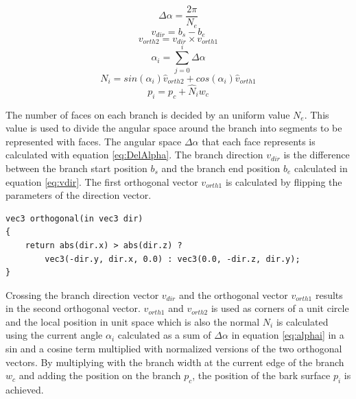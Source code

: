 \documentclass[11pt]{article} %
\begin{document}
\begin{equation}
	\label{eq:DelAlpha}
	\Delta \alpha = \frac{2 \pi}{N_{e}}
\end{equation}
\begin{equation}
	\label{eq:vdir}
	v_{dir} = b_{s} - b_{e} 
\end{equation}
\begin{equation}
	\label{eq:vcross}
	v_{orth2} = v_{dir}\times v_{orth1}
\end{equation}
\begin{equation}
	\label{eq:alphai}
	\alpha_{i} = \sum_{j = 0}^{i}\Delta \alpha
\end{equation}
\begin{equation}
	\label{eq:betai}
	N_{i} = sin(\alpha_{i}) \hat{v}_{orth2} + cos(\alpha_{i}) \hat{v}_{orth1}
\end{equation}
\begin{equation}
	\label{eq:pi}
	p_{i}=p_{c} +  \hat{N}_{i} w_{c}
\end{equation}

The number of faces on each branch is decided by an uniform value $N_{e}$.
This value is used to divide the angular space around the branch into segments to be represented with faces.
The angular space $ \Delta \alpha $ that each face represents is calculated with equation \ref{eq:DelAlpha}.
The branch direction $ v_{dir} $ is the difference between the branch start position $ b_{s} $
and the branch end position $ b_{e} $ calculated in equation \ref{eq:vdir}.
The first orthogonal vector $ v_{orth1} $ is calculated by flipping the parameters of the direction vector.

\begin{lstlisting}
vec3 orthogonal(in vec3 dir)
{
	return abs(dir.x) > abs(dir.z) ? 
		vec3(-dir.y, dir.x, 0.0) : vec3(0.0, -dir.z, dir.y);
}
\end{lstlisting}

Crossing the branch direction vector $ v_{dir} $ and the orthogonal vector $ v_{orth1} $ results in the second orthogonal vector.
$ v_{orth1} $ and $ v_{orth2} $ is used as corners of a unit circle and the local position in unit space which is also the normal $ N_{i} $ is calculated using the current angle $ \alpha_{i} $ calculated as a sum of $ \Delta \alpha $ in equation \ref{eq:alphai} in a sin and a cosine term multiplied with normalized versions of the two orthogonal vectors.
By multiplying with the branch width at the current edge of the branch $ w_{c} $ and adding the position on the branch $ p_{c} $, the position of the bark surface $ p_{i} $ is achieved.
\end{document}
